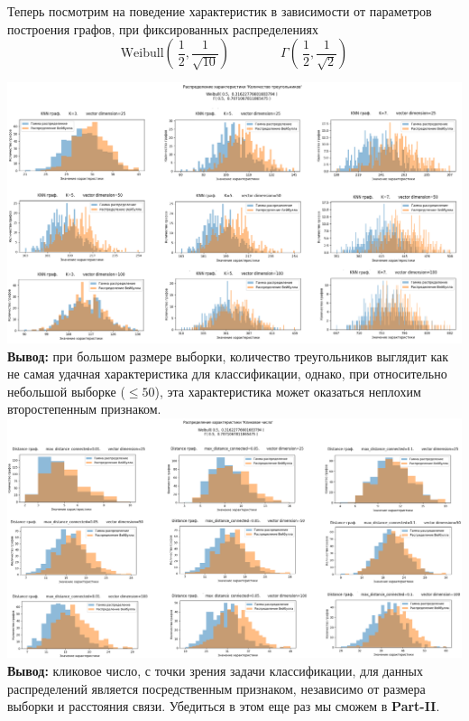 
Теперь посмотрим на поведение характеристик в зависимости от параметров построения графов, при фиксированных распределениях
\begin{equation*}
    \text{Weibull}(\ \frac{1}{2}, \frac{1}{\sqrt{10}}) \qquad\qquad \Gamma(\ \frac{1}{2}, \frac{1}{\sqrt2})
\end{equation*}

\hspace*{-1cm}
\includegraphics[width=1\textwidth]{Part-I_student-2/point 2_histogram_KNN.png}\\ 

\textbf{Вывод:} при большом размере выборки, количество треугольников выглядит как не самая удачная характеристика для классификации, однако, при относительно небольшой выборке ($\leq 50$), эта характеристика может оказаться неплохим второстепенным признаком.\\ 

\hspace*{-1cm}
\includegraphics[width=1\textwidth]{Part-I_student-2/point 2_histogram_Dist.png}\\ 

\textbf{Вывод:} кликовое число, с точки зрения задачи классификации, для данных распределений является посредственным признаком, независимо от размера выборки и расстояния связи. Убедиться в этом  еще раз мы сможем в \textbf{Part-II}. 